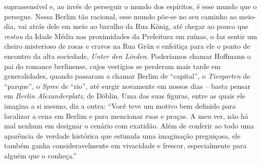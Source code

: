 suprassensível e, ao invés de perseguir o mundo dos espíritos, é esse
mundo que o persegue. Nessa Berlim tão racional, esse mundo põe-se no
seu caminho ao meio-dia, vai atrás dele em meio ao barulho da Rua König,
até chegar ao pouco que \emph{restou} da Idade Média nas proximidades da
Prefeitura em ruínas, o faz sentir um cheiro misterioso de rosas e
cravos na Rua Grün e enfeitiça para ele o ponto de encontro da alta
sociedade, \emph{Unter den Linden}. Poderíamos chamar Hoffmann o pai do
romance berlinense, cujos vestígios se perderam mais tarde em
generalidades, quando passaram a chamar Berlim de ``capital'', o
\emph{Tiergarten} de ``parque'', o \emph{Spree} de ``rio'', até surgir
novamente em nossos dias -- basta pensar em \emph{Berlin
Alexanderplatz}, de Döblin. Uma das suas figuras, entre as quais ele
imagina a si mesmo, diz a outra: ``Você teve um motivo bem definido para
localizar a cena em Berlim e para mencionar ruas e praças. A meu ver,
não há mal nenhum em designar o cenário com exatidão. Além de conferir
ao todo uma aparência de verdade histórica que estimula uma imaginação
preguiçosa, ele também ganha consideravelmente em vivacidade e frescor,
especialmente para alguém que o conheça.''

